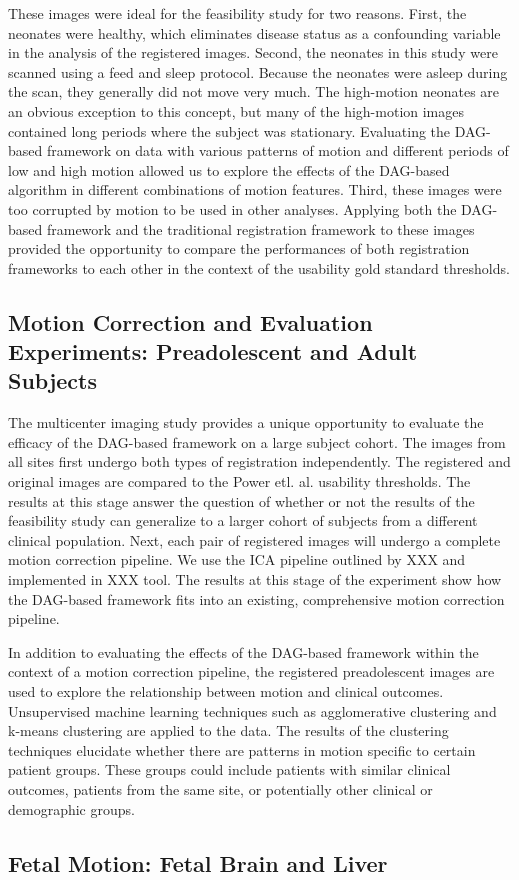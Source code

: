 These images were ideal for the feasibility study for two reasons. First, the neonates were healthy, which eliminates disease status as a confounding variable in the analysis of the registered images. Second, the neonates in this study were scanned using a feed and sleep protocol. Because the neonates were asleep during the scan, they generally did not move very much. The high-motion neonates are an obvious exception to this concept, but many of the high-motion images contained long periods where the subject was stationary. Evaluating the DAG-based framework on data with various patterns of motion and different periods of low and high motion allowed us to explore the effects of the DAG-based algorithm in different combinations of motion features. Third, these images were too corrupted by motion to be used in other analyses. Applying both the DAG-based framework and the traditional registration framework to these images provided the opportunity to compare the performances of both registration frameworks to each other in the context of the usability gold standard thresholds. 

\subsection{Motion Correction and Evaluation Experiments: Preadolescent and Adult Subjects}

The multicenter imaging study provides a unique opportunity to evaluate the efficacy of the DAG-based framework on a large subject cohort. The images from all sites first undergo both types of registration independently. The registered and original images are compared to the Power etl. al. usability thresholds. The results at this stage answer the question of whether or not the results of the feasibility study can generalize to a larger cohort of subjects from a different clinical population. Next, each pair of registered images will undergo a complete motion correction pipeline. We use the ICA pipeline outlined by XXX and implemented in XXX tool. The results at this stage of the experiment show how the DAG-based framework fits into an existing, comprehensive motion correction pipeline. 

In addition to evaluating the effects of the DAG-based framework within the context of a motion correction pipeline, the registered preadolescent images are used to explore the relationship between motion and clinical outcomes. Unsupervised machine learning techniques such as agglomerative clustering and k-means clustering are applied to the data. The results of the clustering techniques elucidate whether there are patterns in motion specific to certain patient groups. These groups could include patients with similar clinical outcomes, patients from the same site, or potentially other clinical or demographic groups.

\subsection{Fetal Motion: Fetal Brain and Liver}